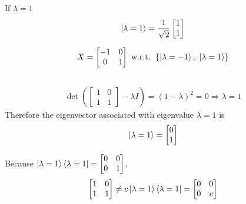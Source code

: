 If $\lambda = 1$
\begin{align}
	\ket{\lambda = 1} = \frac{1}{\sqrt{2}} 
	\begin{bmatrix}
	1 \\ 
	1 
	\end{bmatrix}
\end{align}

\begin{align}
	X = \begin{bmatrix}
	-1 & 0 \\ 
	0 & 1
	\end{bmatrix} 
	\text{ w.r.t. } \left\{ \ket{\lambda = -1},\ \ket{\lambda = 1}\right\}
\end{align}



\subsection{}
\begin{align}
	\det \left(\begin{bmatrix}
	1 & 0 \\ 
	1 & 1
	\end{bmatrix} - \lambda I \right) = (1 - \lambda)^2 = 0 \Rightarrow \lambda = 1
\end{align}
Therefore the eigenvector associated with eigenvalue $\lambda = 1$ is 
\begin{align}
	\ket{\lambda = 1} = \begin{bmatrix}
	0 \\ 
	1
	\end{bmatrix} 
\end{align}

Because $\ket{\lambda = 1}\bra{\lambda = 1} = \begin{bmatrix}
0 & 0 \\ 
0 & 1
\end{bmatrix}$, 
\begin{align}
	\begin{bmatrix}
	1 & 0 \\ 
	1 & 1
	\end{bmatrix} \neq c\ket{\lambda = 1}\bra{\lambda = 1} = \begin{bmatrix}
	0 & 0 \\ 
	0 & c
	\end{bmatrix}
\end{align}